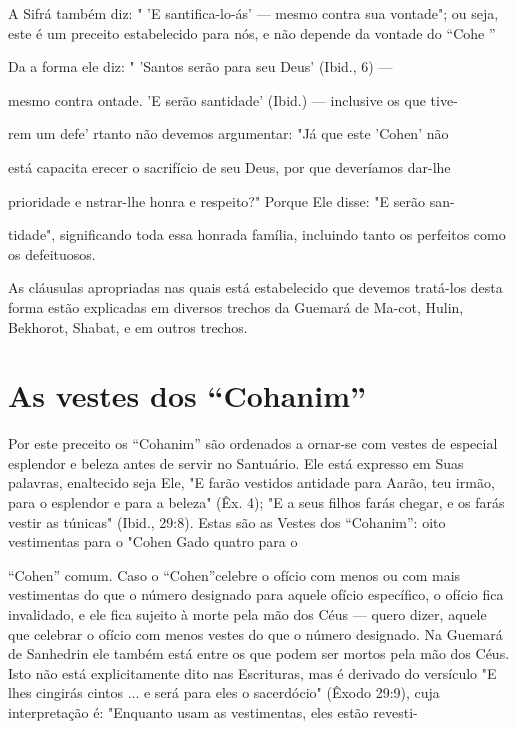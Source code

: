 A Sifrá também diz: " 'E santifica-lo-ás' --- mesmo contra sua
vonta­de"; ou seja, este é um preceito estabelecido para nós, e não
depende da von­tade do ``Cohe ''

Da a forma ele diz: " 'Santos serão para seu Deus' (Ibid., 6) ---

mesmo contra ontade. 'E serão santidade' (Ibid.) --- inclusive os que
tive-

rem um defe' rtanto não devemos argumentar: "Já que este 'Cohen' não

está capacita erecer o sacrifício de seu Deus, por que deveríamos
dar-lhe

prioridade e nstrar-lhe honra e respeito?" Porque Ele disse: "E serão
san-

tidade", significando toda essa honrada família, incluindo tanto os
perfeitos co­mo os defeituosos.

As cláusulas apropriadas nas quais está estabelecido que devemos
tratá-los desta forma estão explicadas em diversos trechos da Guemará de
Ma-cot, Hulin, Bekhorot, Shabat, e em outros trechos.


\section{As vestes dos ``Cohanim''}


Por este preceito os ``Cohanim'' são ordenados a ornar-se com ves­tes de
especial esplendor e beleza antes de servir no Santuário. Ele está
expresso em Suas palavras, enaltecido seja Ele, "E farão vestidos antidade
para Aarão, teu irmão, para o esplendor e para a beleza" (Êx. 4); "E a seus
filhos farás chegar, e os farás vestir as túnicas" (Ibid., 29:8). Estas são as
Vestes dos ``Cohanim'': oito vestimentas para o "Cohen Gado quatro para o


 
``Cohen'' comum. Caso o ``Cohen''celebre o ofício com menos ou com mais
vestimentas do que o número designado para aquele ofício específico, o
ofício fica invalidado, e ele fica sujeito à morte pela mão dos Céus ---
quero dizer, aquele que celebrar o ofício com menos vestes do que o
número designado. Na Guemará de Sanhedrin ele também está entre os que
podem ser mortos pela mão dos Céus. Isto não está explicitamente dito
nas Escrituras, mas é derivado do versículo "E lhes cingirás cintos ...
e será para eles o sacerdócio" (Êxodo 29:9), cuja interpretação é:
"Enquanto usam as vestimentas, eles estão revesti-

